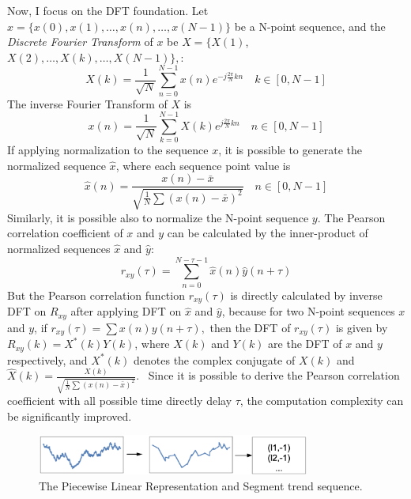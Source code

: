 Now, I focus on the DFT foundation. Let $x=\{x(0), x(1), \ldots, x(n), \ldots, x(N-1)\}$ be a N-point sequence, and the \textit{Discrete Fourier Transform} of $x$ be $X=\{X(1)$, $X(2), \ldots, X(k), \ldots, X(N-1)\},$:
\begin{equation}
X(k)=\frac{1}{\sqrt{N}} \sum_{n=0}^{N-1} x(n) e^{-j \frac{2 \pi}{N} k n} \quad k \in[0, N-1]
\end{equation}
The inverse Fourier Transform of $X$ is
\begin{equation}
x(n)=\frac{1}{\sqrt{N}} \sum_{k=0}^{N-1} X(k) e^{j \frac{2 \pi}{N} k n} \quad n \in[0, N-1]
\end{equation}
If applying normalization to the sequence $x$, it is possible to generate the normalized sequence $\hat{x}$, where each sequence point value is
\begin{equation}
\hat{x}(n)=\frac{x(n)-\bar{x}}{\sqrt{\frac{1}{N} \sum(x(n)-\bar{x})^{2}}} \quad n \in[0, N-1]
\end{equation}
Similarly, it is possible also to normalize the N-point sequence $y$. The Pearson correlation coefficient of $x$ and $y$ can be calculated by the inner-product of normalized sequences $\hat{x}$ and $\hat{y}$:
\begin{equation}
r_{x y}(\tau)=\sum_{n=0}^{N-\tau-1} \hat{x}(n) \hat{y}(n+\tau)
\end{equation}
But the Pearson correlation function $r_{x y}(\tau)$ is directly calculated by inverse DFT on $R_{x y}$ after applying DFT on $\hat{x}$ and $\hat{y}$, because for two N-point sequences $x$ and $y$, if $r_{x y}(\tau)=\sum x(n) y(n+\tau),$ then the DFT of $r_{x y}(\tau)$ is given by $R_{x y}(k)=X^{*}(k) Y(k)$, where $X(k)$ and $Y(k)$ are the DFT of $x$ and $y$ respectively, and $X^{*}(k)$ denotes the complex conjugate of $X(k)$ and $\hat{X}(k)=\frac{X(k)}{\sqrt{\frac{1}{N} \sum(x(n)-\bar{x})^{2}}}$.~\cite{ref8} Since it is possible to derive the Pearson correlation coefficient with all possible time directly delay $\tau$, the computation complexity can be significantly improved. 
\begin{figure}[H]
\centering
    \label{fig:DFT_PLR}
    \includegraphics[width=0.8\textwidth]{figures/plr.png}
    \caption{The Piecewise Linear Representation and Segment trend sequence.}
\end{figure}
